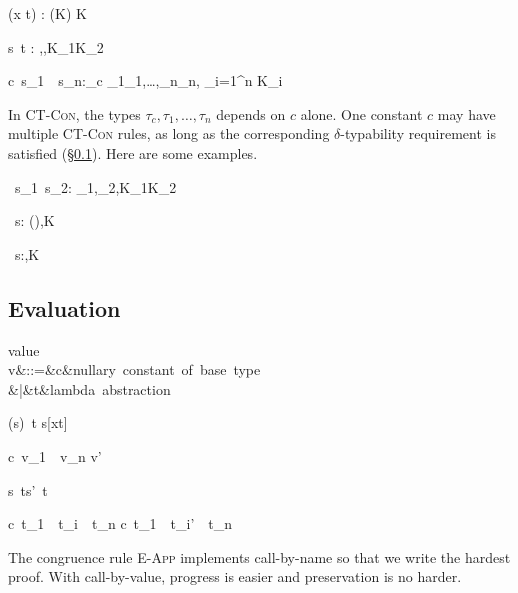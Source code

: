 \documentclass{amsart}
\theoremstyle{definition}
\begin{document}
{\Gamma\vdash (\Abs x t) :
(\sigma\R\tau\Given K) \Given K}

{\Gamma\vdash s~t : \beta \Given
\sigma\Sub\alpha\R\beta,\tau\Sub\alpha,K_1\cup K_2}

{\Gamma\vdash c~s_1~\cdots~s_n:\tau_c\Given
\sigma_1\Sub\tau_1,\ldots,\sigma_n\Sub\tau_n,
{\textstyle\bigcup_{i=1}^n K_i}
}

In \textsc{CT-Con}, the types $\tau_c,\tau_1,\ldots,\tau_n$
depends on $c$ alone. One constant $c$ may have multiple
\textsc{CT-Con} rules, as long as the corresponding
$\delta$-typability requirement is satisfied
(\S\ref{eval}). Here are some examples.

{\Gamma\vdash\Add~s_1~s_2:
\Int\Given\sigma_1\Sub\Int,\sigma_2\Sub\Int,K_1\cup K_2}

{\Gamma\vdash\If~s:
(\All\alpha\alpha\R\alpha\R\alpha)\Given\sigma\Sub\Bool,K}

{\Gamma\vdash\Fix~s:\alpha\Given\sigma\Sub \alpha\R\alpha,K}

\subsection{Evaluation}
\label{eval}

\begin{syntax}
\mbox{value}\\
v&::=&c&\mbox{nullary constant of base type}\\
&|&t&\mbox{lambda abstraction}
\end{syntax}

\infrule[$\beta$]
{}
{(s)~t \Red s[x\mapsto t]}

\infrule[$\delta$]
{}
{c~v_1~\cdots~v_n \Red v'}

{s~t\Red s'~t}

{c~t_1~\cdots~t_i~\cdots~t_n
\Red
c~t_1~\cdots~t_i'~\cdots~t_n
}

The congruence rule \textsc{E-App} implements call-by-name so
that we write the hardest proof. With call-by-value, progress is
easier and preservation is no harder.
\end{document}
